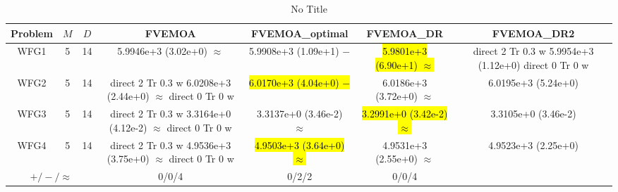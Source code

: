 \documentclass[journal]{IEEEtran}
\newcommand{\semitextbf}[1]{%
\pdfliteral direct {2 Tr 0.3 w} %
#1%
\pdfliteral direct {0 Tr 0 w}%
}
\begin{document}
\begin{table*}[htbp]
\renewcommand{\arraystretch}{1.2}
\centering
\caption{No Title}
\begin{tabular}{ccccccc}
\toprule
Problem&$M$&$D$&FVEMOA&FVEMOA\_optimal&FVEMOA\_DR&FVEMOA\_DR2\\
\midrule
\multirow{1}{*}{WFG1}&5&14&5.9946e+3 (3.02e+0) $\approx$&5.9908e+3 (1.09e+1) $-$&\hl{5.9801e+3 (6.90e+1) $\approx$}&\semitextbf{5.9954e+3 (1.12e+0)}\\
\hline
\multirow{1}{*}{WFG2}&5&14&\semitextbf{6.0208e+3 (2.44e+0) $\approx$}&\hl{6.0170e+3 (4.04e+0) $-$}&6.0186e+3 (3.72e+0) $\approx$&6.0195e+3 (5.24e+0)\\
\hline
\multirow{1}{*}{WFG3}&5&14&\semitextbf{3.3164e+0 (4.12e-2) $\approx$}&3.3137e+0 (3.46e-2) $\approx$&\hl{3.2991e+0 (3.42e-2) $\approx$}&3.3105e+0 (3.46e-2)\\
\hline
\multirow{1}{*}{WFG4}&5&14&\semitextbf{4.9536e+3 (3.75e+0) $\approx$}&\hl{4.9503e+3 (3.64e+0) $\approx$}&4.9531e+3 (2.55e+0) $\approx$&4.9523e+3 (2.25e+0)\\
\hline
\multicolumn{3}{c}{$+/-/\approx$}&0/0/4&0/2/2&0/0/4&\\
\bottomrule
\end{tabular}
\label{No Label}
\end{table*}
\end{document}
